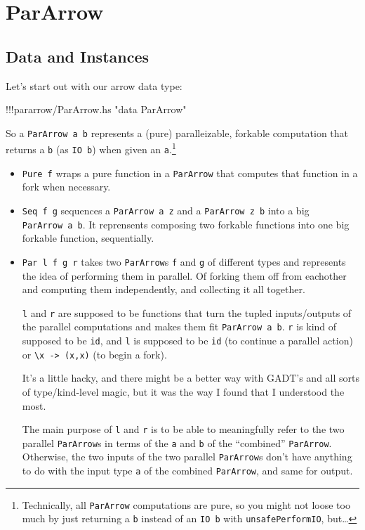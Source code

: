 \documentclass[]{article}
\newenvironment{Shaded}{}{}
\newcommand{\StringTok}[1]{\textcolor[rgb]{0.25,0.44,0.63}{{#1}}}
\newcommand{\FunctionTok}[1]{\textcolor[rgb]{0.02,0.16,0.49}{{#1}}}
\newcommand{\NormalTok}[1]{{#1}}
\begin{document}
\section{ParArrow}\label{pararrow}

\subsection{Data and Instances}\label{data-and-instances}

Let's start out with our arrow data type:

\begin{Shaded}
\begin{Highlighting}[]
\FunctionTok{!!!}\NormalTok{pararrow}\FunctionTok{/}\NormalTok{ParArrow.hs }\StringTok{"data ParArrow"}
\end{Highlighting}
\end{Shaded}

So a \texttt{ParArrow\ a\ b} represents a (pure) paralleizable, forkable
computation that returns a \texttt{b} (as \texttt{IO\ b}) when given an
\texttt{a}.\footnote{Technically, all \texttt{ParArrow} computations are
  pure, so you might not loose too much by just returning a \texttt{b}
  instead of an \texttt{IO\ b} with \texttt{unsafePerformIO},
  but\ldots{}}

\begin{itemize}
\item
  \texttt{Pure\ f} wraps a pure function in a \texttt{ParArrow} that
  computes that function in a fork when necessary.
\item
  \texttt{Seq\ f\ g} sequences a \texttt{ParArrow\ a\ z} and a
  \texttt{ParArrow\ z\ b} into a big \texttt{ParArrow\ a\ b}. It
  reprensents composing two forkable functions into one big forkable
  function, sequentially.
\item
  \texttt{Par\ l\ f\ g\ r} takes two \texttt{ParArrow}s \texttt{f} and
  \texttt{g} of different types and represents the idea of performing
  them in parallel. Of forking them off from eachother and computing
  them independently, and collecting it all together.

  \texttt{l} and \texttt{r} are supposed to be functions that turn the
  tupled inputs/outputs of the parallel computations and makes them fit
  \texttt{ParArrow\ a\ b}. \texttt{r} is kind of supposed to be
  \texttt{id}, and \texttt{l} is supposed to be \texttt{id} (to continue
  a parallel action) or
  \texttt{\textbackslash{}x\ -\textgreater{}\ (x,x)} (to begin a fork).

  It's a little hacky, and there might be a better way with GADT's and
  all sorts of type/kind-level magic, but it was the way I found that I
  understood the most.

  The main purpose of \texttt{l} and \texttt{r} is to be able to
  meaningfully refer to the two parallel \texttt{ParArrow}s in terms of
  the \texttt{a} and \texttt{b} of the ``combined'' \texttt{ParArrow}.
  Otherwise, the two inputs of the two parallel \texttt{ParArrow}s don't
  have anything to do with the input type \texttt{a} of the combined
  \texttt{ParArrow}, and same for output.
\end{itemize}
\end{document}
